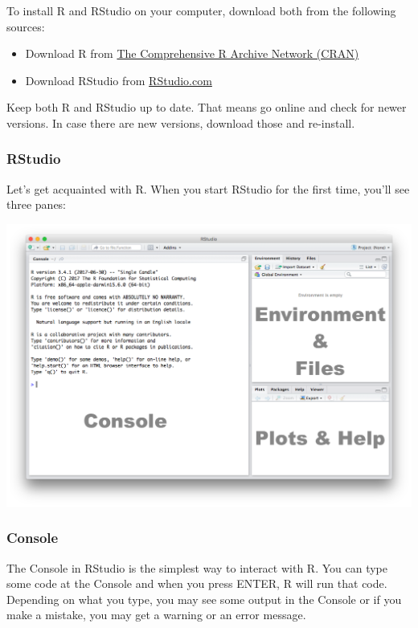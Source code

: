 \documentclass[]{article}
\providecommand{\tightlist}{%
  \setlength{\itemsep}{0pt}\setlength{\parskip}{0pt}}
\begin{document}
To install R and RStudio on your computer, download both from the following sources:

\begin{itemize}
\tightlist
\item
  Download R from \href{https://cran.r-project.org}{The Comprehensive R Archive Network (CRAN)}
\item
  Download RStudio from \href{https://www.rstudio.com}{RStudio.com}
\end{itemize}

Keep both R and RStudio up to date. That means go online and check for newer versions. In case there are new versions, download those and re-install.

\hypertarget{rstudio}{%
\subsubsection{RStudio}\label{rstudio}}

Let's get acquainted with R. When you start RStudio for the first time, you'll see three panes:

\includegraphics{./img/rstudio_default.png}

\hypertarget{console}{%
\subsubsection{Console}\label{console}}

The Console in RStudio is the simplest way to interact with R. You can type some code at the Console and when you press ENTER, R will run that code. Depending on what you type, you may see some output in the Console or if you make a mistake, you may get a warning or an error message.
\end{document}
